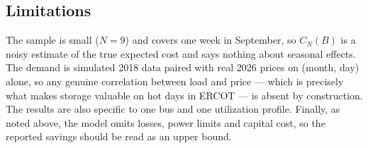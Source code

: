 \subsection{Limitations}

The sample is small ($N=9$) and covers one week in September, so $C_N(B)$ is a
noisy estimate of the true expected cost and says nothing about seasonal effects.
The demand is simulated 2018 data paired with real 2026 prices on (month, day)
alone, so any genuine correlation between load and price --- which is precisely
what makes storage valuable on hot days in ERCOT --- is absent by construction.
The results are also specific to one bus and one utilization profile. Finally, as
noted above, the model omits losses, power limits and capital cost, so the reported
savings should be read as an upper bound.
